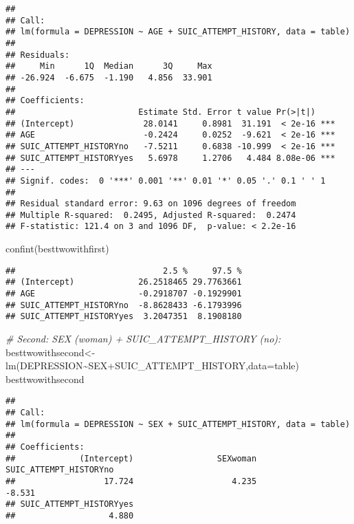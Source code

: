 \documentclass[
]{book}
\newenvironment{Shaded}{\begin{snugshade}}{\end{snugshade}}
\newcommand{\AttributeTok}[1]{\textcolor[rgb]{0.77,0.63,0.00}{#1}}
\newcommand{\CommentTok}[1]{\textcolor[rgb]{0.56,0.35,0.01}{\textit{#1}}}
\newcommand{\FunctionTok}[1]{\textcolor[rgb]{0.00,0.00,0.00}{#1}}
\newcommand{\NormalTok}[1]{#1}
\newcommand{\OtherTok}[1]{\textcolor[rgb]{0.56,0.35,0.01}{#1}}
\newcommand{\SpecialCharTok}[1]{\textcolor[rgb]{0.00,0.00,0.00}{#1}}
\begin{document}
\begin{verbatim}
## 
## Call:
## lm(formula = DEPRESSION ~ AGE + SUIC_ATTEMPT_HISTORY, data = table)
## 
## Residuals:
##     Min      1Q  Median      3Q     Max 
## -26.924  -6.675  -1.190   4.856  33.901 
## 
## Coefficients:
##                         Estimate Std. Error t value Pr(>|t|)    
## (Intercept)              28.0141     0.8981  31.191  < 2e-16 ***
## AGE                      -0.2424     0.0252  -9.621  < 2e-16 ***
## SUIC_ATTEMPT_HISTORYno   -7.5211     0.6838 -10.999  < 2e-16 ***
## SUIC_ATTEMPT_HISTORYyes   5.6978     1.2706   4.484 8.08e-06 ***
## ---
## Signif. codes:  0 '***' 0.001 '**' 0.01 '*' 0.05 '.' 0.1 ' ' 1
## 
## Residual standard error: 9.63 on 1096 degrees of freedom
## Multiple R-squared:  0.2495, Adjusted R-squared:  0.2474 
## F-statistic: 121.4 on 3 and 1096 DF,  p-value: < 2.2e-16
\end{verbatim}

\begin{Shaded}
\begin{Highlighting}[]
\FunctionTok{confint}\NormalTok{(besttwowithfirst)}
\end{Highlighting}
\end{Shaded}

\begin{verbatim}
##                              2.5 %     97.5 %
## (Intercept)             26.2518465 29.7763661
## AGE                     -0.2918707 -0.1929901
## SUIC_ATTEMPT_HISTORYno  -8.8628433 -6.1793996
## SUIC_ATTEMPT_HISTORYyes  3.2047351  8.1908180
\end{verbatim}

\begin{Shaded}
\begin{Highlighting}[]
\CommentTok{\# Second: SEX (woman) + SUIC\_ATTEMPT\_HISTORY (no):}
\NormalTok{besttwowithsecond}\OtherTok{\textless{}{-}}\FunctionTok{lm}\NormalTok{(DEPRESSION}\SpecialCharTok{\textasciitilde{}}\NormalTok{SEX}\SpecialCharTok{+}\NormalTok{SUIC\_ATTEMPT\_HISTORY,}\AttributeTok{data=}\NormalTok{table)}
\NormalTok{besttwowithsecond}
\end{Highlighting}
\end{Shaded}

\begin{verbatim}
## 
## Call:
## lm(formula = DEPRESSION ~ SEX + SUIC_ATTEMPT_HISTORY, data = table)
## 
## Coefficients:
##             (Intercept)                 SEXwoman   SUIC_ATTEMPT_HISTORYno  
##                  17.724                    4.235                   -8.531  
## SUIC_ATTEMPT_HISTORYyes  
##                   4.880
\end{verbatim}
\end{document}
